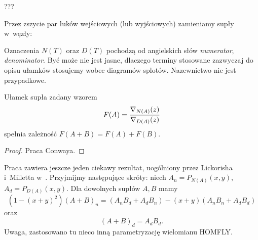 \begin{tobedone}[notacja Conwaya]
    \label{conway_notation}
    ???
\end{tobedone}

Przez zszycie par łuków wejściowych (lub wyjściowych) zamieniamy supły w~węzły:


Oznaczenia $N(T)$ oraz $D(T)$ pochodzą od angielskich słów \emph{numerator}, \emph{denominator}.
Być może nie jest jasne, dlaczego terminy stosowane zazwyczaj do opisu ułamków stosujemy wobec diagramów splotów.
Nazewnictwo nie jest przypadkowe. %

\begin{proposition}
    Ułamek supła zadany wzorem
    \[
        F(A) = \frac{\nabla_{N(A)}(z)}{\nabla_{D(A)}(z)}
    \]
    spełnia zależność $F(A+B) = F(A) + F(B)$.
\end{proposition}

\begin{proof}
    Praca \cite{conway70} Conwaya.
\end{proof}


\begin{tobedone}
    Praca \cite{conway70} zawiera jeszcze jeden ciekawy rezultat, uogólniony przez Lickorisha i~Milletta w~\cite{lickorish87}.
    Przyjmijmy następujące skróty: niech $A_n = P_{N(A)}(x,y)$, $A_d = P_{D(A)}(x,y)$.
    Dla dowolnych supłów $A, B$ mamy
    \[
    (1 - (x+y)^2)(A+B)_n = (A_nB_d + A_dB_n) - (x+y)(A_nB_n+  A_dB_d)
    \]
    oraz
    \[
        (A+B)_d = A_dB_d.
    \]
    Uwaga, zastosowano tu nieco inną parametryzację wielomianu HOMFLY.
\end{tobedone}




